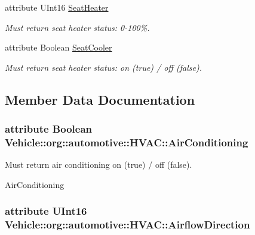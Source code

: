\begin{DoxyCompactItemize}
attribute U\-Int16 \hyperlink{interfaceVehicle_1_1org_1_1automotive_1_1HVAC_a35b84693d02a453f5e6c42bb0be1403d}{Seat\-Heater}
\begin{DoxyCompactList}\small\item\em Must return seat heater status\-: 0-\/100\%. \end{DoxyCompactList}\item 
attribute Boolean \hyperlink{interfaceVehicle_1_1org_1_1automotive_1_1HVAC_a08e7409d8a8430411765525ec0e1b446}{Seat\-Cooler}
\begin{DoxyCompactList}\small\item\em Must return seat heater status\-: on (true) / off (false). \end{DoxyCompactList}\end{DoxyCompactItemize}


\subsection{Member Data Documentation}
\hypertarget{interfaceVehicle_1_1org_1_1automotive_1_1HVAC_a0d01d4b7f12f4ba9dc6de33dadcdd3e8}{
\subsubsection[{Air\-Conditioning}]{\setlength{\rightskip}{0pt plus 5cm}attribute Boolean Vehicle\-::org\-::automotive\-::\-H\-V\-A\-C\-::\-Air\-Conditioning}}\label{interfaceVehicle_1_1org_1_1automotive_1_1HVAC_a0d01d4b7f12f4ba9dc6de33dadcdd3e8}


Must return air conditioning on (true) / off (false). 

Air\-Conditioning \hypertarget{interfaceVehicle_1_1org_1_1automotive_1_1HVAC_a91be6d491f88140a27438fb52047de10}{
\subsubsection[{Airflow\-Direction}]{\setlength{\rightskip}{0pt plus 5cm}attribute U\-Int16 Vehicle\-::org\-::automotive\-::\-H\-V\-A\-C\-::\-Airflow\-Direction}}\label{interfaceVehicle_1_1org_1_1automotive_1_1HVAC_a91be6d491f88140a27438fb52047de10}


